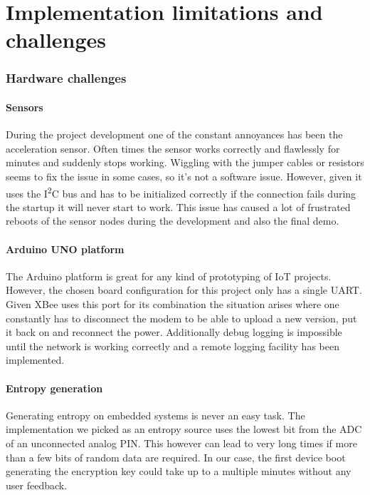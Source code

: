 \documentclass[a4paper,11pt]{scrartcl}
\begin{document}
\part{Implementation limitations and challenges}
\section{Hardware challenges}
\subsection{Sensors}\label{subsec:sensors}
During the project development one of the constant annoyances has been the acceleration sensor. Often times the sensor works correctly and flawlessly for minutes and suddenly stops working. Wiggling with the jumper cables or resistors seems to fix the issue in some cases, so it's not a software issue. However, given it uses the I\textsuperscript{2}C bus and has to be initialized correctly if the connection fails during the startup it will never start to work. This issue has caused a lot of frustrated reboots of the sensor nodes during the development and also the final demo.

\subsection{Arduino UNO platform}\label{subsec:uart}
The Arduino platform is great for any kind of prototyping of IoT projects. However, the chosen board configuration for this project only has a single UART. Given XBee uses this port for its combination the situation arises where one constantly has to disconnect the modem to be able to upload a new version, put it back on and reconnect the power. Additionally debug logging is impossible until the network is working correctly and a remote logging facility has been implemented.

\subsection{Entropy generation}\label{subsec:entropy}
Generating entropy on embedded systems is never an easy task. The implementation we picked as an entropy source uses the lowest bit from the ADC of an unconnected analog PIN. This however can lead to very long times if more than a few bits of random data are required. In our case, the first device boot generating the encryption key could take up to a multiple minutes without any user feedback.
\end{document}
